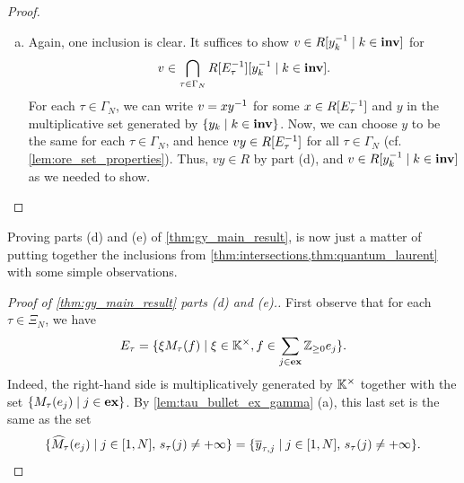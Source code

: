 {\begin{proof}
\begin{enumerate}[(a)]
		      By using the total order on $\Gamma_N$, the first part of the claim then shows that
		      \begin{equation*}
			      m_{\sigma, (\sigma_\bullet\sigma)\inv(j)} = m_{\tau, (\tau_\bullet\tau)\inv(j)}
		      \end{equation*}
		      for all $\sigma, \tau \in \Gamma_N$ and $j \in [1, N]$. Because of
		      \cref{lem:tau_bullet_ex_gamma} (b), we can find $\tau, \tau' \in \Gamma_N$ such that
		      $\tau' = \tau(k, k+1)$ for some $k\in[1, N-1]$ with $\eta(\tau(k)) = \eta(\tau(k+1))$
		      and $\tau_\bullet(\tau(k)) = j$, for any $j \in \ex$. So, the second part of the claim
		      then implies that $m_{\tau, (\tau_\bullet\tau)\inv(j)} = 0$, and hence $m_{\sigma,
					      (\sigma_\bullet\sigma)\inv(j)} = 0$ for all $\sigma\in \Gamma_N$. In particular, this
		      holds for $\tau = \id$, and it follows that $v \in R$.
		\item Again, one inclusion is clear. It suffices to show $v \in R[y_k^{-1} \mid k \in \mathbf{inv}]$
		      for
		      \begin{equation*}
			      v \in \bigcap_{\tau \in \Gamma_N} R[E_\tau^{-1}][y_k^{-1} \mid k \in \mathbf{inv}].
		      \end{equation*}
		      For each $\tau \in \Gamma_N$, we can write $v = xy^{-1}$ for some $x \in R[E^{-1}_\tau]$
		      and $y$ in the multiplicative set generated by $\{y_k \mid k \in \mathbf{inv}\}$. Now, we can
		      choose $y$ to be the same for each $\tau \in \Gamma_N$, and hence $vy \in
			      R[E^{-1}_\tau]$ for all $\tau \in \Gamma_N$ (cf. \cref{lem:ore_set_properties}). Thus,
		      $vy\in R$ by part (d), and $v \in R[y_k^{-1} \mid k \in \mathbf{inv}]$ as we needed to show.
	\end{enumerate}
\end{proof}

Proving parts (d) and (e) of \cref{thm:gy_main_result}, is now just a matter of putting
together the inclusions from \cref{thm:intersections,thm:quantum_laurent} with some
simple observations.
\begin{proof}[Proof of \cref{thm:gy_main_result} parts (d) and (e).]
	First observe that for each $\tau\in \Xi_N$, we have
	\begin{equation*}
		E_\tau = \{\xi M_\tau(f) \mid \xi \in \mathbb{K}^\times, f \in \sum_{j \in \mathbf{ex}} \mathbb{Z}_{\geq 0} e_j\}.
	\end{equation*}
	Indeed, the right-hand side is multiplicatively generated by $\mathbb{K}^\times$ together
	with the set $\{ M_\tau(e_j) \mid j \in \mathbf{ex}\}$. By \cref{lem:tau_bullet_ex_gamma} (a),
	this last set is the same as the set
	\begin{equation*}
		\{ \widehat{M}_\tau(e_j) \mid j \in [1, N],\, s_\tau(j) \neq + \infty\} = \{ \overline{y}_{\tau, j} \mid j \in [1, N],\, s_\tau(j) \neq + \infty\}.
	\end{equation*}


\end{proof}}
